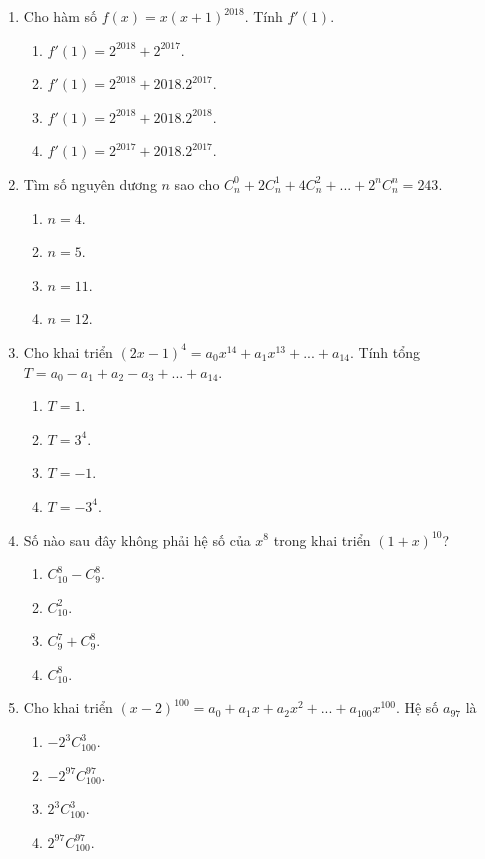 \begin{enumerate}[label=\textbf{Câu \arabic*.},align=left,left=0cm..0cm,itemindent=*]
	\item Cho hàm số $f(x)=x(x+1)^{2018}$. Tính $f'(1)$.
	\begin{enumerate}[label=\textbf{\Alph*.},align=left,left=1cm..0cm,itemindent=*]
		\item $f'(1)=2^{2018}+2^{2017}$.
		\item $f'(1)=2^{2018}+2018.2^{2017}$.
		\item $f'(1)=2^{2018}+2018.2^{2018}$.
		\item $f'(1)=2^{2017}+2018.2^{2017}$.
	\end{enumerate}
	\item Tìm số nguyên dương $n$ sao cho $C_n^0+2C_n^1+4C_n^2+...+2^nC_n^n=243$.
	\begin{enumerate}[label=\textbf{\Alph*.},align=left,left=1cm..0cm,itemindent=*]
		\item $n=4$. \item $n=5$. \item $n=11$. \item $n=12$.
	\end{enumerate}
	\item Cho khai triển $(2x-1)^4=a_0x^{14}+a_1x^{13}+...+a_{14}$. Tính tổng $T=a_0-a_1+a_2-a_3+...+a_{14}$.
	\begin{enumerate}[label=\textbf{\Alph*.},align=left,left=1cm..0cm,itemindent=*]
		\item $T=1$. \item $T=3^4$. \item $T=-1$. \item $T=-3^4$.
	\end{enumerate}
	\item Số nào sau đây không phải hệ số của $x^8$ trong khai triển $(1+x)^{10}$?
	\begin{enumerate}[label=\textbf{\Alph*.},align=left,left=1cm..0cm,itemindent=*]
		\item $C_{10}^8-C_9^8$. \item $C_{10}^2$. \item $C_9^7+C_9^8$. \item $C_{10}^8$.
	\end{enumerate}
	\item Cho khai triển $(x-2)^{100}=a_0+a_1x+a_2x^2+...+a_{100}x^{100}$. Hệ số $a_{97}$ là
	\begin{enumerate}[label=\textbf{\Alph*.},align=left,left=1cm..0cm,itemindent=*]
		\item $-2^3C_{100}^3$. \item $-2^{97}C_{100}^{97}$. \item $2^3C_{100}^3$. \item $2^{97}C_{100}^{97}$.

\end{enumerate}
\end{enumerate}
